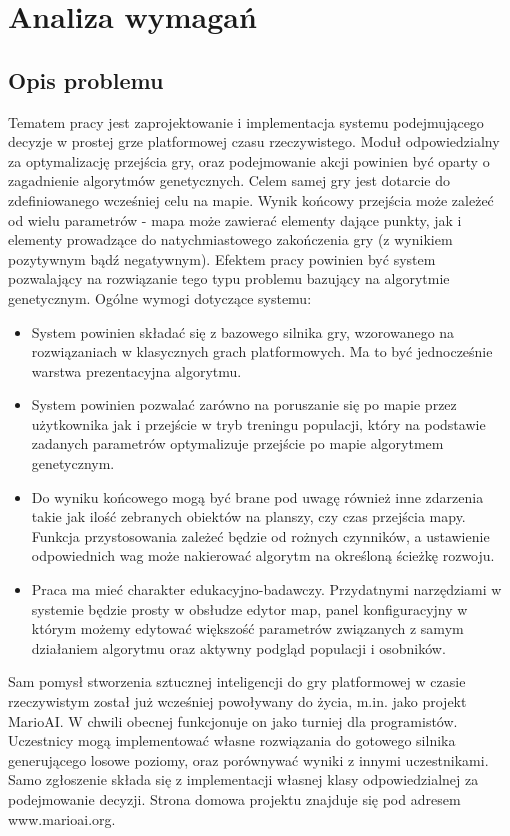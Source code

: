 \section{Analiza wymagań}
\subsection{Opis problemu}
\begin{par}
	Tematem pracy jest zaprojektowanie i implementacja systemu podejmującego decyzje w prostej grze platformowej czasu rzeczywistego.
	Moduł odpowiedzialny za optymalizację przejścia gry, oraz podejmowanie akcji powinien być oparty o zagadnienie algorytmów genetycznych.
	Celem samej gry jest dotarcie do zdefiniowanego wcześniej celu na mapie. Wynik końcowy przejścia może zależeć od wielu parametrów - mapa może zawierać elementy dające punkty, jak i elementy prowadzące do natychmiastowego zakończenia gry (z wynikiem pozytywnym bądź negatywnym).
	Efektem pracy powinien być system pozwalający na rozwiązanie tego typu problemu bazujący na algorytmie genetycznym.
	\newline
	Ogólne wymogi dotyczące systemu:
	\begin{itemize}
		\item
			System powinien składać się z bazowego silnika gry, wzorowanego na rozwiązaniach w klasycznych grach platformowych. Ma to być jednocześnie warstwa prezentacyjna algorytmu.
		\item
			System powinien pozwalać zarówno na poruszanie się po mapie przez użytkownika jak i przejście w tryb treningu populacji, który na podstawie zadanych parametrów optymalizuje przejście po mapie algorytmem genetycznym.
		\item
			Do wyniku końcowego mogą być brane pod uwagę również inne zdarzenia takie jak ilość zebranych obiektów na planszy, czy czas przejścia mapy.
			Funkcja przystosowania zależeć będzie od rożnych czynników, a ustawienie odpowiednich wag może nakierować algorytm na określoną ścieżkę rozwoju.
		\item
			Praca ma mieć charakter edukacyjno-badawczy. Przydatnymi narzędziami w systemie będzie prosty w obsłudze edytor map, panel konfiguracyjny w którym możemy edytować większość parametrów związanych z samym działaniem algorytmu oraz aktywny podgląd populacji i osobników.
	\end{itemize}
\end{par}

\begin{par}
	Sam pomysł stworzenia sztucznej inteligencji do gry platformowej w czasie rzeczywistym został już wcześniej powoływany do życia, m.in. jako projekt MarioAI. 
	W chwili obecnej funkcjonuje on jako turniej dla programistów. 
	Uczestnicy mogą implementować własne rozwiązania do gotowego silnika generującego losowe poziomy, oraz porównywać wyniki z innymi uczestnikami.
	Samo zgłoszenie składa się z implementacji własnej klasy odpowiedzialnej za podejmowanie decyzji.
	Strona domowa projektu znajduje się pod adresem www.marioai.org.
\end{par}
